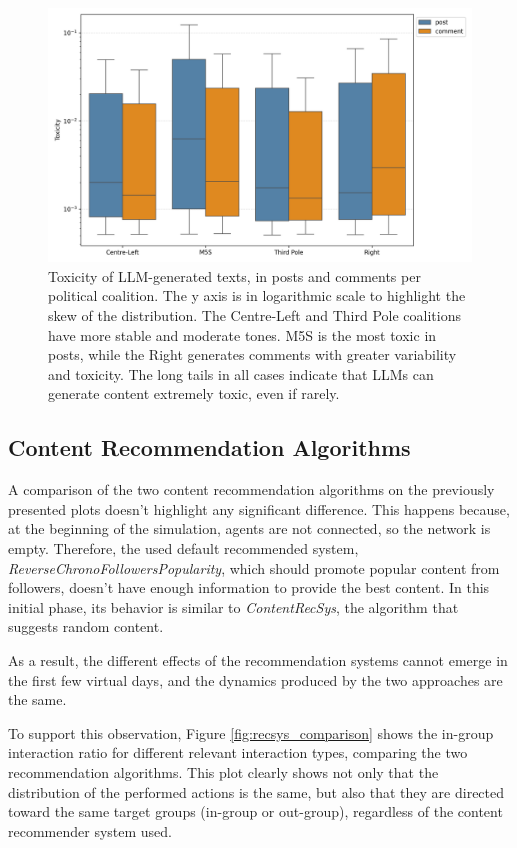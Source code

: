 \begin{figure}[h]
    \centering
    \includegraphics[width=0.6\linewidth]{Images/Toxicity/box_posts_vs_comments.png}
    \caption{Toxicity of LLM-generated texts, in posts and comments per political coalition.
    The y axis is in logarithmic scale to highlight the skew of the distribution.
    The Centre-Left and Third Pole coalitions have more stable and moderate tones.
    M5S is the most toxic in posts, while the Right generates comments with greater variability and toxicity.
    The long tails in all cases indicate that LLMs can generate content extremely toxic, even if rarely.}
    \label{fig:toxicity_box}
\end{figure}


\subsection{Content Recommendation Algorithms}
A comparison of the two content recommendation algorithms on the previously presented plots doesn't highlight any significant difference.
This happens because, at the beginning of the simulation, agents are not connected, so the network is empty.
Therefore, the used default recommended system, \textit{ReverseChronoFollowersPopularity}, which should promote popular content from followers, doesn't have enough information to provide the best content.
In this initial phase, its behavior is similar to \textit{ContentRecSys}, the algorithm that suggests random content.

As a result, the different effects of the recommendation systems cannot emerge in the first few virtual days, and the dynamics produced by the two approaches are the same.

To support this observation, Figure \ref{fig:recsys_comparison} shows the in-group interaction ratio for different relevant interaction types, comparing the two recommendation algorithms.
This plot clearly shows not only that the distribution of the performed actions is the same, but also that they are directed toward the same target groups (in-group or out-group), regardless of the content recommender system used.

